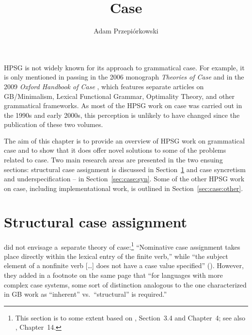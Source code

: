 \documentclass[output=paper]{langsci/langscibook}
\author{%
	Adam Przepiórkows­ki\affiliation{Polish Academy of Sciences}%
}
\title{Case}
\begin{document}
\label{chap-case}


HPSG is not widely known for its approach to grammatical case.  For example, it is only mentioned in passing in the 2006 monograph \emph{Theories of Case} \citep[225]{butt:06} and in the 2009 \emph{Oxford Handbook of Case} \citep[43]{mal:spe:09}, which features separate articles on GB/Minimalism, Lexical Functional Grammar, Optimality Theory, and other grammatical frameworks.  As most of the HPSG work on case was carried out in the 1990s and early 2000s, this perception is unlikely to have changed since the publication of these two volumes.

The aim of this chapter is to provide an overview of HPSG work on grammatical case and to show that it does offer novel solutions to some of the problems related to case.  Two main research areas are presented in the two ensuing sections: structural case assignment is discussed in Section~\ref{sec:case:str} and case syncretism and underspecification – in Section~\ref{sec:case:syn}.  Some of the other HPSG work on case, including implementational work, is outlined in Section~\ref{sec:case:other}.  %


\section{Structural case assignment}
\label{sec:case:str}

\citet{ps2} did not envisage a~separate theory of case:\footnote{This section is to some extent based on \citealt{Prze99b}, Section~3.4 and Chapter~4; see also \citealt{MuellerLehrbuch3}, Chapter~14.} “Nominative case assignment takes place directly within the lexical entry of the finite verb,” while “the subject  element of a nonfinite verb […] does not have a case value specified” ().  However, they added in a footnote on the same page that “for languages with more complex case systems, some sort of distinction analogous to the one characterized in GB work as “inherent” vs.~“structural” is required.”  
\end{document}
